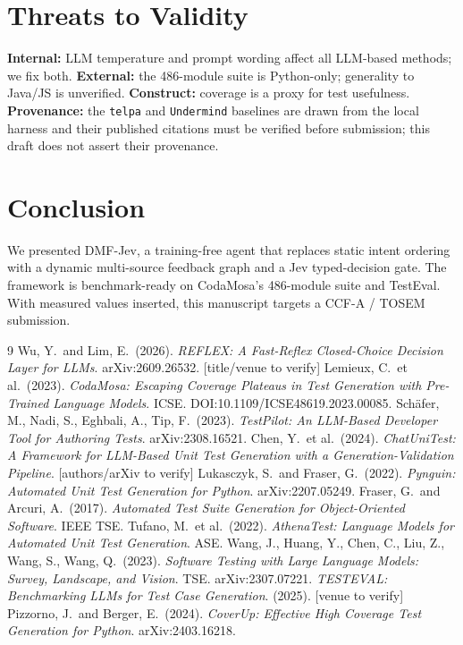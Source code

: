 \documentclass[11pt]{article}
\begin{document}
\section{Threats to Validity}
\label{sec:threats}
\textbf{Internal:} LLM temperature and prompt wording affect all LLM-based methods; we fix both. \textbf{External:} the 486-module suite is Python-only; generality to Java/JS is unverified. \textbf{Construct:} coverage is a proxy for test usefulness. \textbf{Provenance:} the \texttt{telpa} and \texttt{Undermind} baselines are drawn from the local harness and their published citations must be verified before submission; this draft does not assert their provenance.

\section{Conclusion}
We presented DMF-Jev, a training-free agent that replaces static intent ordering with a dynamic multi-source feedback graph and a Jev typed-decision gate. The framework is benchmark-ready on CodaMosa's 486-module suite and TestEval. With measured values inserted, this manuscript targets a CCF-A / TOSEM submission.

\begin{thebibliography}{9}
 Wu, Y.\ and Lim, E.\ (2026). \emph{REFLEX: A Fast-Reflex Closed-Choice Decision Layer for LLMs}. arXiv:2609.26532. \textcolor{warn}{[title/venue to verify]}
 Lemieux, C.\ et al.\ (2023). \emph{CodaMosa: Escaping Coverage Plateaus in Test Generation with Pre-Trained Language Models}. ICSE. DOI:10.1109/ICSE48619.2023.00085.
 Sch\"afer, M., Nadi, S., Eghbali, A., Tip, F.\ (2023). \emph{TestPilot: An LLM-Based Developer Tool for Authoring Tests}. arXiv:2308.16521.
 Chen, Y.\ et al.\ (2024). \emph{ChatUniTest: A Framework for LLM-Based Unit Test Generation with a Generation-Validation Pipeline}. \textcolor{warn}{[authors/arXiv to verify]}
 Lukasczyk, S.\ and Fraser, G.\ (2022). \emph{Pynguin: Automated Unit Test Generation for Python}. arXiv:2207.05249.
 Fraser, G.\ and Arcuri, A.\ (2017). \emph{Automated Test Suite Generation for Object-Oriented Software}. IEEE TSE.
 Tufano, M.\ et al.\ (2022). \emph{AthenaTest: Language Models for Automated Unit Test Generation}. ASE.
 Wang, J., Huang, Y., Chen, C., Liu, Z., Wang, S., Wang, Q.\ (2023). \emph{Software Testing with Large Language Models: Survey, Landscape, and Vision}. TSE. arXiv:2307.07221.
 \emph{TESTEVAL: Benchmarking LLMs for Test Case Generation}. (2025). \textcolor{warn}{[venue to verify]}
 Pizzorno, J.\ and Berger, E.\ (2024). \emph{CoverUp: Effective High Coverage Test Generation for Python}. arXiv:2403.16218.
\end{thebibliography}
\end{document}
